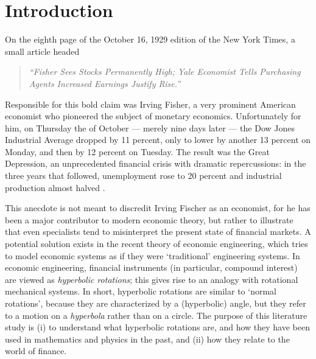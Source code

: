 \chapter{Introduction}
\label{chap:intro}
On the eighth page of the October 16, 1929 edition of the New York Times, a small article headed
\begin{quote}
    \emph{``Fisher Sees Stocks Permanently High; Yale Economist Tells Purchasing Agents Increased Earnings Justify Rise.''}  \cite{NYT1929}
\end{quote}
Responsible for this bold claim was Irving Fisher, a very prominent American economist who pioneered  the subject of monetary economics. Unfortunately for him, on Thursday the  of October --- merely nine days later --- the Dow Jones Industrial Average dropped by 11 percent, only to lower by another 13 percent on Monday, and then by 12 percent on Tuesday. The result was the Great Depression, an unprecedented financial crisis with dramatic repercussions: in the three years that followed, unemployment rose to 20 percent and industrial production almost halved \cite{gdepression}. 
 
This anecdote is not meant to discredit Irving Fischer as an economist, for he has been a major contributor to modern economic theory, but rather to illustrate that even specialists tend to misinterpret the present state of financial markets. A potential solution exists in the recent theory of economic engineering, which tries to model economic systems as if they were `traditional' engineering systems. In economic engineering, financial instruments (in particular, compound interest) are viewed as \emph{hyperbolic rotations}; this gives rise to an analogy with rotational mechanical systems. In short, hyperbolic rotations are similar to `normal rotations', because they are characterized by a (hyperbolic) angle, but they refer to a motion on a \emph{hyperbola} rather than on a circle. The purpose of this literature study is (i) to understand what hyperbolic rotations are, and how they have been used in mathematics and physics in the past, and (ii) how they relate to the world of finance. 

